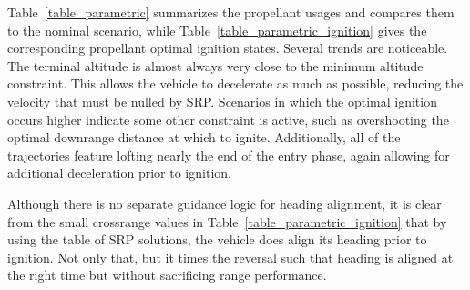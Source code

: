 \documentclass[letterpaper, preprint, paper,11pt]{AAS}
\begin{document}
Table~\ref{table_parametric} summarizes the propellant usages and compares them to the nominal scenario, while Table~\ref{table_parametric_ignition} gives the corresponding propellant optimal ignition states. Several trends are noticeable. The terminal altitude is almost always very close to the minimum altitude constraint. This allows the vehicle to decelerate as much as possible, reducing the velocity that must be nulled by SRP. Scenarios in which the optimal ignition occurs higher indicate some other constraint is active, such as overshooting the optimal downrange distance at which to ignite. Additionally, all of the trajectories feature lofting nearly the end of the entry phase, again allowing for additional deceleration prior to ignition. 

Although there is no separate guidance logic for heading alignment, it is clear from the small crossrange values in Table~\ref{table_parametric_ignition} that by using the table of SRP solutions, the vehicle does align its heading prior to ignition. Not only that, but it times the reversal such that heading is aligned at the right time but without sacrificing range performance. 

%
%
\end{document}
